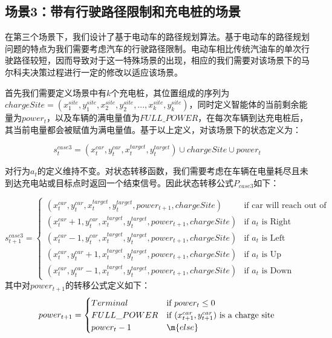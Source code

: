 \documentclass{standalone}
\begin{document}
\subsection{场景3：带有行驶路径限制和充电桩的场景}
在第三个场景下，我们设计了基于电动车的路径规划算法。基于电动车的路径规划问题的特点为我们需要考虑汽车的行驶路径限制。电动车相比传统汽油车的单次行驶路径较短，因而导致对于这一特殊场景的出现，相应的我们需要对该场景下的马尔科夫决策过程进行一定的修改以适应该场景。\par
首先我们需要定义场景中有$k$个充电桩，其位置组成的序列为$chargeSite = (x_1^{site}, y_1^{site}, x_2^{site}, y_2^{site}, ... , x_k^{site}, y_k^{site})$，同时定义智能体的当前剩余能量为$power_t$，以及车辆的满电量值为$FULL\_POWER$，在每次车辆到达充电桩后，其当前电量都会被赋值为满电量值。基于以上定义，对该场景下的状态定义为：
\begin{center}
    \begin{equation}
        s_t^{case3} = (x_t^{car}, y_t^{car}, x^{target}_t, y^{target}_t) \cup chargeSite \cup power_t
    \end{equation}
\end{center}
对行为$a_t$的定义维持不变。对状态转移函数，我们需要考虑在车辆在电量耗尽且未到达充电站或目标点时返回一个结束信号。因此状态转移公式$P_{case3}$如下：
\begin{center}
    \begin{equation}
    s_{t+1}^{case3} = \begin{cases}
    (x_t^{car}, y_t^{car}, x^{target}_t, y^{target}_t, power_{t+1}, chargeSite) &\mbox{if car will reach out of map}\\
    (x_t^{car} + 1, y_t^{car}, x^{target}_t, y^{target}_t, power_{t+1}, chargeSite) &\mbox{if $a_t$ is Right}\\
    (x_t^{car} - 1, y_t^{car}, x^{target}_t, y^{target}_t, power_{t+1}, chargeSite) &\mbox{if $a_t$ is Left}\\
    (x_t^{car}, y_t^{car} + 1, x^{target}_t, y^{target}_t, power_{t+1}, chargeSite) &\mbox{if $a_t$ is Up}\\
    (x_t^{car}, y_t^{car} - 1, x^{target}_t, y^{target}_t, power_{t+1}, chargeSite) &\mbox{if $a_t$ is Down}
    \end{cases}
    \end{equation}
    \mbox{其中对$power_{t+1}$的转移公式定义如下：}
    \begin{equation}
        power_{t+1} = \begin{cases}
        Terminal &\mbox{if $power_t \leq 0$}\\
        FULL\_POWER &\mbox{if $(x_{t+1}^{car}, y_{t+1}^{car})$ is a charge site}\\
        power_{t} - 1 &\m{else}
        \end{cases}
    \end{equation}
\end{center}
\end{document}
